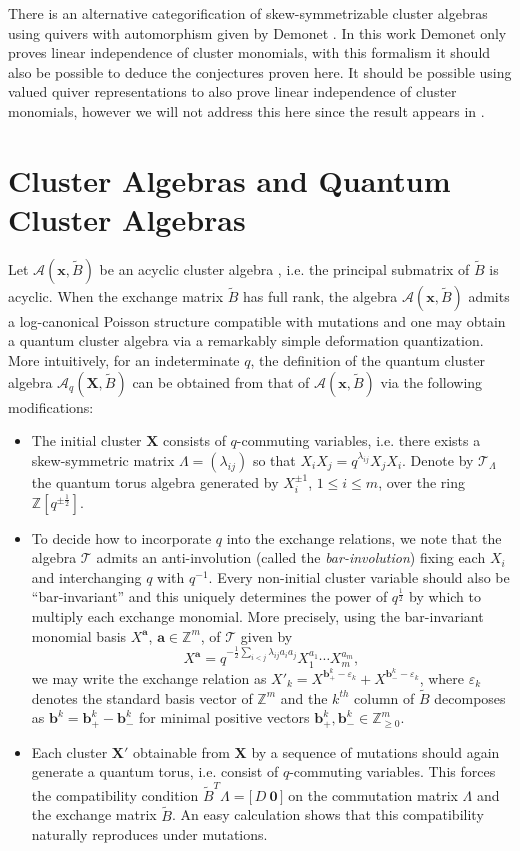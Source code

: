 \documentclass[12pt]{amsart}
\newcommand{\bfa}{\mathbf{a}}
\newcommand{\bfb}{\mathbf{b}}
\newcommand{\bfx}{\mathbf{x}}
\newcommand{\bfX}{\mathbf{X}}
\newcommand{\cA}{\mathcal{A}}
\newcommand{\cT}{\mathcal{T}}
\newcommand{\half}{{\frac{1}{2}}}
\newcommand{\ZZ}{\mathbb{Z}}
\begin{document}
  There is an alternative categorification of skew-symmetrizable cluster algebras using quivers with automorphism given by Demonet \cite{demonet}.
  In this work Demonet only proves linear independence of cluster monomials, with this formalism it should also be possible to deduce the conjectures proven here. 
  It should be possible using valued quiver representations to also prove linear independence of cluster monomials, however we will not address this here since the result appears in \cite{demonet}.

  \section{Cluster  Algebras and Quantum Cluster Algebras} Let $\cA(\bfx,\tilde B)$ be an acyclic cluster algebra \cite{berenstein-fomin-zelevinsky}, i.e. the principal submatrix of $\tilde B$ is acyclic.  
  When the exchange matrix $\tilde B$ has full rank, the algebra $\cA(\bfx,\tilde B)$ admits a log-canonical Poisson structure compatible with mutations \cite{gekhtman-shapiro-vainshtein} and one may obtain a quantum cluster algebra via a remarkably simple deformation quantization.  
  More intuitively, for an indeterminate $q$, the definition of the quantum cluster algebra $\cA_q(\bfX,\tilde B)$ can be obtained from that of $\cA(\bfx,\tilde B)$ via the following modifications:
  \begin{itemize}
    \item The initial cluster $\bfX$ consists of $q$-commuting variables, i.e. there exists a skew-symmetric matrix $\Lambda=(\lambda_{ij})$ so that $X_iX_j=q^{\lambda_{ij}}X_jX_i$.  
    Denote by $\cT_\Lambda$ the quantum torus algebra generated by $X_i^{\pm1}$, $1\le i\le m$, over the ring $\ZZ[q^{\pm\half}]$.
    \item To decide how to incorporate $q$ into the exchange relations, we note that the algebra $\cT$ admits an anti-involution (called the \emph{bar-involution}) fixing each $X_i$ and interchanging $q$ with $q^{-1}$.
    Every non-initial cluster variable should also be ``bar-invariant'' and this uniquely determines the power of $q^\half$ by which to multiply each exchange monomial.  
    More precisely, using the bar-invariant monomial basis $X^\bfa$, $\bfa\in\ZZ^m$, of $\cT$ given by
    \[X^\bfa=q^{-\half\sum\limits_{i<j}\lambda_{ij}a_ia_j}X_1^{a_1}\cdots X_m^{a_m},\]
    we may write the exchange relation as $X'_k=X^{\bfb_+^k-\varepsilon_k}+X^{\bfb_-^k-\varepsilon_k}$, where $\varepsilon_k$ denotes the standard basis vector of $\ZZ^m$ and the $k^{th}$ column of $\tilde B$ decomposes as $\bfb^k=\bfb^k_+-\bfb^k_-$ for minimal positive vectors $\bfb^k_+,\bfb^k_-\in\ZZ_{\ge0}^m$.
    \item Each cluster $\bfX'$ obtainable from $\bfX$ by a sequence of mutations should again generate a quantum torus, i.e. consist of $q$-commuting variables.
      This forces the compatibility condition $\tilde B^T\Lambda=\big[\,D\ \boldsymbol{0}\,\big]$ on the commutation matrix $\Lambda$ and the exchange matrix $\tilde B$.
    An easy calculation shows that this compatibility naturally reproduces under mutations.
  \end{itemize}
\end{document}
